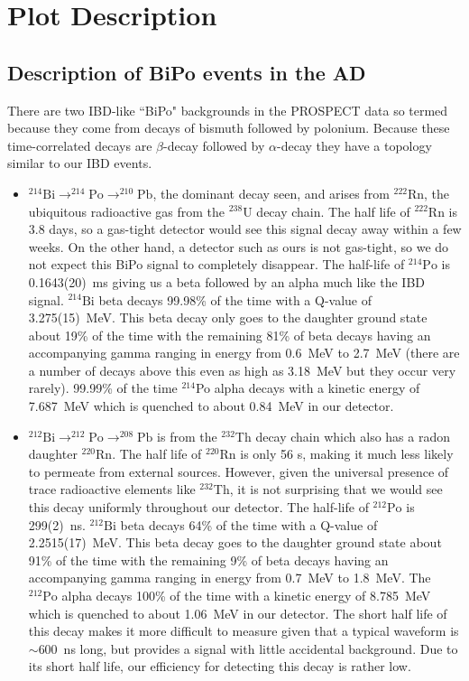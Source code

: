 




\section{Plot Description}
\subsection{Description of BiPo events in the AD}
There are two IBD-like ``BiPo" backgrounds in the PROSPECT data so termed because they come from decays of bismuth followed by polonium. Because these time-correlated decays are $\beta$-decay followed by $\alpha$-decay they have a topology similar to our IBD events. 
\begin{itemize}
\item{$^{214}\textrm{Bi}\rightarrow^{214}\textrm{Po}\rightarrow^{210}\textrm{Pb}$, the dominant decay seen, and arises from $^{222}$Rn, the ubiquitous radioactive gas from the $^{238}$U decay chain. The half life of $^{222}$Rn is 3.8 days, so a gas-tight detector would see this signal decay away within a few weeks. On the other hand, a detector such as ours is not gas-tight, so we do not expect this BiPo signal to completely disappear. The half-life of $^{214}\textrm{Po}$ is 0.1643(20)~ms giving us a beta followed by an alpha much like the IBD signal. $^{214}\textrm{Bi}$ beta decays 99.98\% of the time with a Q-value of 3.275(15)~MeV. This beta decay only goes to the daughter ground state about 19\% of the time with the remaining 81\% of beta decays having an accompanying gamma ranging in energy from 0.6~MeV to 2.7~MeV (there are a number of decays above this even as high as 3.18~MeV but they occur very rarely). 99.99\% of the time $^{214}$Po alpha decays with a kinetic energy of 7.687~MeV which is quenched to about 0.84~MeV in our detector. }
\item{$^{212}\textrm{Bi}\rightarrow^{212}\textrm{Po}\rightarrow^{208}\textrm{Pb}$ is from the $^{232}$Th decay chain which also has a radon daughter $^{220}$Rn. The half life of $^{220}$Rn is only 56 s, making it much less likely to permeate from external sources. However, given the universal presence of trace radioactive elements like $^{232}$Th, it is not surprising that we would see this decay uniformly throughout our detector. The half-life of $^{212}\textrm{Po}$ is 299(2)~ns. $^{212}\textrm{Bi}$ beta decays 64\% of the time with a Q-value of 2.2515(17)~MeV. This beta decay goes to the daughter ground state about 91\% of the time with the remaining 9\% of beta decays having an accompanying gamma ranging in energy from 0.7~MeV to 1.8~MeV. The  $^{212}\textrm{Po}$ alpha decays 100\% of the time with a kinetic energy of 8.785~MeV which is quenched to about 1.06~MeV in our detector. The short half life of this decay makes it more difficult to measure given that a typical waveform is $\sim$600~ns long, but provides a signal with little accidental background. Due to its short half life, our efficiency for detecting this decay is rather low.}
\end{itemize}

